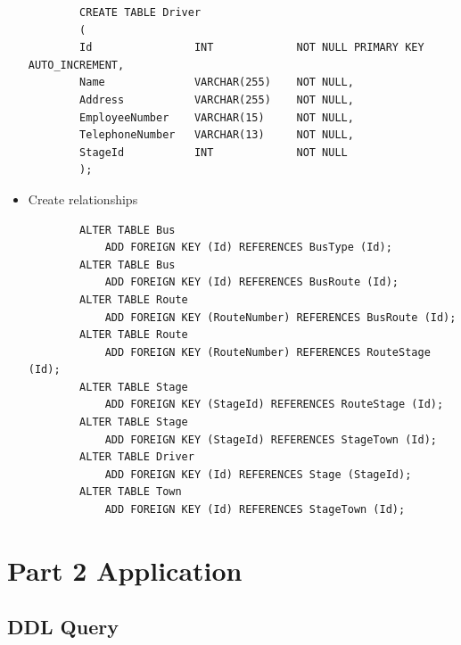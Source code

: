\documentclass[12pt,titlepage]{article}
\begin{document}
\begin{itemize}
\begin{verbatim}
        CREATE TABLE Driver 
        (
        Id                INT             NOT NULL PRIMARY KEY AUTO_INCREMENT,
        Name              VARCHAR(255)    NOT NULL,
        Address           VARCHAR(255)    NOT NULL,
        EmployeeNumber    VARCHAR(15)     NOT NULL,
        TelephoneNumber   VARCHAR(13)     NOT NULL,
        StageId           INT             NOT NULL
        );
    \end{verbatim}
    \item Create relationships
    \begin{verbatim}
        ALTER TABLE Bus 
            ADD FOREIGN KEY (Id) REFERENCES BusType (Id);
        ALTER TABLE Bus 
            ADD FOREIGN KEY (Id) REFERENCES BusRoute (Id);
        ALTER TABLE Route 
            ADD FOREIGN KEY (RouteNumber) REFERENCES BusRoute (Id);
        ALTER TABLE Route 
            ADD FOREIGN KEY (RouteNumber) REFERENCES RouteStage (Id);
        ALTER TABLE Stage 
            ADD FOREIGN KEY (StageId) REFERENCES RouteStage (Id);
        ALTER TABLE Stage 
            ADD FOREIGN KEY (StageId) REFERENCES StageTown (Id);
        ALTER TABLE Driver 
            ADD FOREIGN KEY (Id) REFERENCES Stage (StageId);
        ALTER TABLE Town 
            ADD FOREIGN KEY (Id) REFERENCES StageTown (Id);
    \end{verbatim}
\end{itemize}

\section*{Part 2 Application}

\subsection*{DDL Query}
\end{document}
